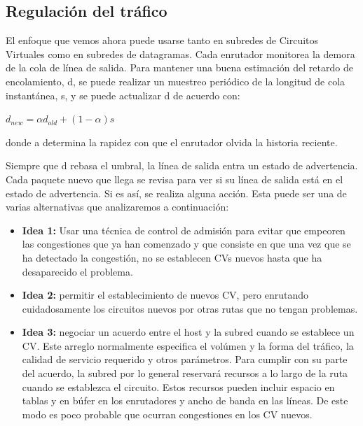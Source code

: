\documentclass[10pt,a4paper]{report}
\begin{document}
\subsection{Regulación del tráfico}

	\par El enfoque que vemos ahora puede usarse tanto en subredes de Circuitos Virtuales
como en subredes de datagramas. Cada enrutador monitorea la demora de la cola de línea de salida. Para mantener una buena estimación del retardo de encolamiento, d, se puede realizar un muestreo periódico de la longitud de cola instantánea, s, y se puede actualizar d de acuerdo con:

	\begin{center}
		$ d_{new} = \alpha d_{old} + (1-\alpha) s $
	\end{center}

	\par donde a determina la rapidez con que el enrutador olvida la historia reciente.

	\par Siempre que d rebasa el umbral, la línea de salida entra un estado de advertencia. Cada paquete nuevo que llega se revisa para ver si su línea de salida está en el estado de advertencia. Si es así, se realiza alguna acción. Esta puede ser una de varias alternativas que analizaremos a continuación:

	\begin{itemize}
		\item \textbf{Idea 1:} Usar una técnica de control de admisión para evitar que empeoren las congestiones que ya han comenzado y que consiste en que una vez que se ha detectado la congestión, no se establecen CVs nuevos hasta que ha desaparecido el problema.
		\item \textbf{Idea 2:} permitir el establecimiento de nuevos CV, pero enrutando cuidadosamente los circuitos nuevos por otras rutas que no tengan problemas.

		\item \textbf{Idea 3:} negociar un acuerdo entre el host y la subred cuando se
establece un CV. Este arreglo normalmente especifica el volúmen y la forma del tráfico, la calidad de servicio requerido y otros parámetros. Para cumplir con su parte del acuerdo, la subred por lo general reservará recursos a lo largo de la ruta cuando se establezca el circuito. Estos recursos pueden incluir espacio en tablas y en búfer en los enrutadores y ancho de banda en las líneas. De este modo es poco probable que ocurran congestiones en los CV nuevos.
	\end{itemize}
\end{document}
